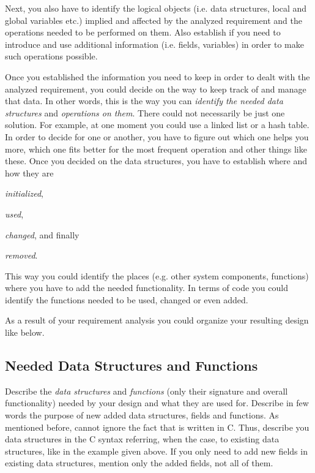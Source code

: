 Next, you also have to identify the logical objects (i.e. data structures, local and global variables etc.) implied and affected by the analyzed requirement and the operations needed to be performed on them. Also establish if you need to introduce and use additional information (i.e. fields, variables) in order to make such operations possible. 

Once you established the information you need to keep in order to dealt with the analyzed requirement, you could decide on the way to keep track of and manage that data. 
In other words, this is the way you can \textit{identify the needed data structures} and \textit{operations on them}. There could not necessarily be just one solution. For example, at one moment you could use a linked list or a hash table. In order to decide for one or another, you have to figure out which one helps you more, which one fits better for the most frequent operation and other things like these. Once you decided on the data structures, you have to establish where and how they are
\begin{inparaenum}[(1)]
    \item \textit{initialized}, 
    \item \textit{used}, 
    \item \textit{changed}, and finally 
    \item \textit{removed}.
\end{inparaenum}

This way you could identify the places (e.g. other system components, functions) where you have to add the needed functionality. In terms of \OSName{} code you could identify the functions needed to be used, changed or even added. 

As a result of your requirement analysis you could organize your resulting design like below. 

\subsection{Needed Data Structures and Functions}

Describe the \textit{data structures} and \textit{functions} (only their signature and overall functionality) needed by your design and what they are used for. Describe in few words the purpose of new added data structures, fields and functions. As mentioned before, cannot ignore the fact that \OSName{} is written in C. Thus, describe you data structures in the C syntax referring, when the case, to existing data structures, like in the example given above. If you only need to add new fields in existing data structures, mention only the added fields, not all of them. 

